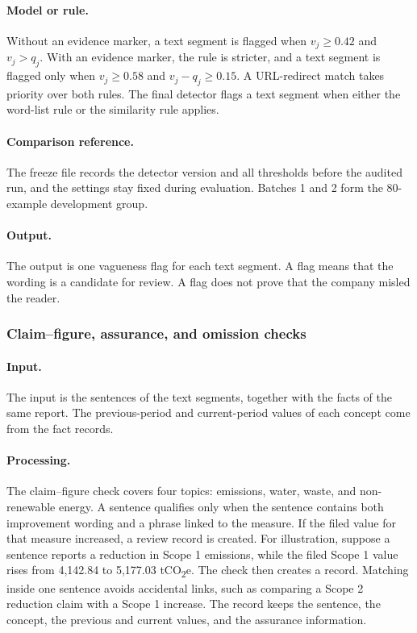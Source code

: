 \paragraph{Model or rule.} Without an evidence marker, a text segment is flagged when $v_j\geq0.42$ and $v_j>q_j$. With an evidence marker, the rule is stricter, and a text segment is flagged only when $v_j\geq0.58$ and $v_j-q_j\geq0.15$. A URL-redirect match takes priority over both rules. The final detector flags a text segment when either the word-list rule or the similarity rule applies.

\paragraph{Comparison reference.} The freeze file records the detector version and all thresholds before the audited run, and the settings stay fixed during evaluation. Batches 1 and 2 form the 80-example development group.

\paragraph{Output.} The output is one vagueness flag for each text segment. A flag means that the wording is a candidate for review. A flag does not prove that the company misled the reader.

\subsubsection{Claim--figure, assurance, and omission checks}

\paragraph{Input.} The input is the sentences of the text segments, together with the facts of the same report. The previous-period and current-period values of each concept come from the fact records.

\paragraph{Processing.} The claim--figure check covers four topics: emissions, water, waste, and non-renewable energy. A sentence qualifies only when the sentence contains both improvement wording and a phrase linked to the measure. If the filed value for that measure increased, a review record is created. For illustration, suppose a sentence reports a reduction in Scope 1 emissions, while the filed Scope 1 value rises from 4,142.84 to 5,177.03 tCO\textsubscript{2}e. The check then creates a record. Matching inside one sentence avoids accidental links, such as comparing a Scope 2 reduction claim with a Scope 1 increase. The record keeps the sentence, the concept, the previous and current values, and the assurance information.

